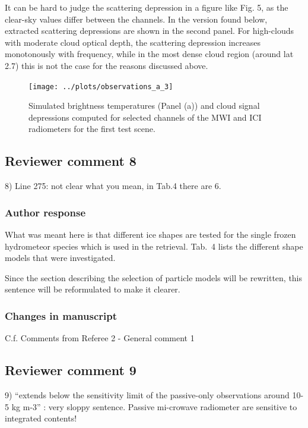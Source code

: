 It can be hard to judge the scattering depression in a figure like Fig. 5, as
the clear-sky values differ between the channels. In the version found below,
extracted scattering depressions are shown in the second panel. For high-clouds
with moderate cloud optical depth, the scattering depression increases
monotonously with frequency, while in the most dense cloud region (around lat
2.7) this is not the case for the reasons discussed above.

\begin{figure}[!hbpt]
  \centering
  \texttt{[image: ../plots/observations\_a\_3]}
  \caption{Simulated brightness temperatures (Panel (a)) and cloud signal
    depressions computed for selected channels of the MWI and ICI radiometers
    for the first test scene.}
  \label{fig:depressions}
\end{figure}

\subsection*{Reviewer comment 8}
8) Line 275: not clear what you mean, in Tab.4 there are 6. 

\subsubsection*{Author response}

What was meant here is that different ice shapes are tested for the single
frozen hydrometeor species which is used in the retrieval. Tab.~4 lists the
different shape models that were investigated.

Since the section describing the selection of particle models will be rewritten,
this sentence will be reformulated to make it clearer.

\subsubsection*{Changes in manuscript}

C.f. Comments from Referee 2 - General comment 1

\subsection*{Reviewer comment 9}

9) “extends below the sensitivity limit of the passive-only observations around
10-5 kg m-3” : very sloppy sentence. Passive mi-crowave radiometer are sensitive
to integrated contents!

